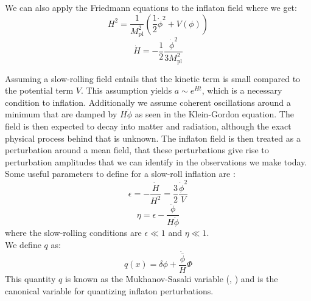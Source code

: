 We can also apply the Friedmann equations to the inflaton field where we get:
\begin{equation}
    H^2 = \frac{1}{M^2_{\text{pl}}}\left( \frac{1}{2} \dot{\phi}^2 + V(\phi) \right)
\end{equation}
\begin{equation}
    \dot{H} = -\frac{1}{2} \frac{\dot{\phi}^2}{3M^2_{\text{pl}}}
\end{equation}

Assuming a slow-rolling field entails that the kinetic term is small compared to the potential term $V$. This assumption yields $a \sim e^{Ht}$, which is a necessary
condition to inflation. Additionally we assume coherent oscillations around a minimum that are damped by $H\dot{\phi}$ as seen in the Klein-Gordon equation. The field is 
then expected to decay into matter and radiation, although the exact physical process behind that is unknown. The 
inflaton field is then treated as a perturbation around a mean field, that these perturbations give rise to perturbation amplitudes that we can identify in the observations we make today. 
Some useful parameters to define for a slow-roll inflation are :
\begin{equation}
    \epsilon = - \frac{\dot{H}}{H^2} = \frac{3}{2} \frac{\dot{\phi}^2}{V}
\end{equation}
\begin{equation}
    \eta = \epsilon - \frac{\ddot{\phi}}{H \dot{\phi}}
\end{equation}
where the slow-rolling conditions are $\epsilon \ll 1$ and $\eta \ll 1$. \\
We define $q$ as:
\begin{equation}
    q(x) = \delta \phi + \frac{\dot{\bar{\phi}}}{H} \Phi
\end{equation}
This quantity $q$ is known as the Mukhanov-Sasaki variable
(\cite{Mukhanov_1988}, \cite{Sasaki_1986}) and is the canonical variable for quantizing inflaton perturbations.\\

